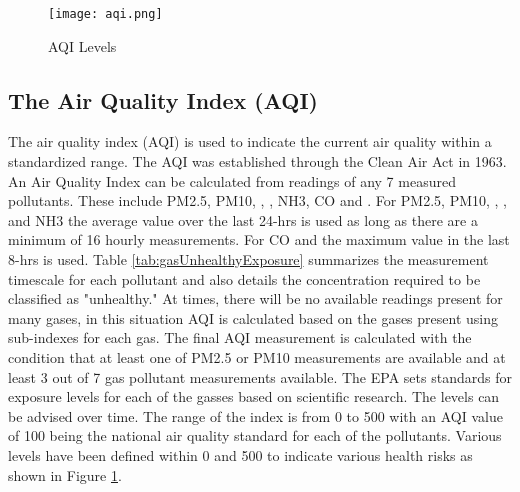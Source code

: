 \begin{figure}[H]
\centering
\texttt{[image: aqi.png]}
\caption{AQI Levels}
\label{fig:aqiLevels}
\end{figure}


\subsection{The Air Quality Index (AQI)}
The air quality index (AQI) is used to indicate the current air quality within a standardized range.
The AQI was established through the Clean Air Act in 1963. An Air Quality Index can be calculated
from readings of any 7 measured pollutants. These include PM2.5, PM10, \sdo, \nox, NH3, CO and
\ozone. For PM2.5, PM10, \sdo, \nox, and NH3 the average value over the last 24-hrs is used as long
as there are a minimum of 16 hourly measurements. For CO and \ozone the maximum value in the last
8-hrs is used. Table \ref{tab:gasUnhealthyExposure} summarizes the measurement timescale for each
pollutant and also details the concentration required to be classified as "unhealthy." At times,
there will be no available readings present for many gases, in this situation AQI is calculated
based on the gases present using sub-indexes for each gas. The final AQI measurement is calculated
with the condition that at least one of PM2.5 or PM10 measurements are available and at least 3 out
of 7 gas pollutant measurements available. The EPA sets standards for exposure levels for each of
the gasses based on scientific research. The levels can be advised over time. The range of the index
is from 0 to 500 with an AQI value of 100 being the national air quality standard for each of the
pollutants. Various levels have been defined within 0 and 500 to indicate various health risks as
shown in Figure \ref{fig:aqiLevels}. 

